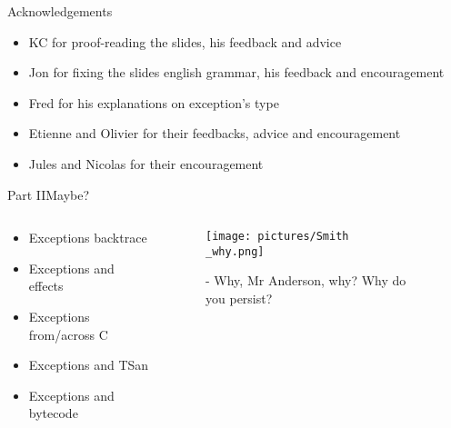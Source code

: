 \begin{frame}{Acknowledgements}
  \begin{itemize}
    \item KC for proof-reading the slides, his feedback and advice
    \item Jon for fixing the slides english grammar, his feedback and encouragement
    \item Fred for his explanations on exception's type
    \item Etienne and Olivier for their feedbacks, advice and encouragement
    \item Jules and Nicolas for their encouragement
  \end{itemize}
\end{frame}

\begin{frame}{Part II}{Maybe?}
  \begin{columns}[c]
    \begin{column}{0.3\textwidth}
      \begin{itemize}
        \item Exceptions backtrace
        \item Exceptions and effects
        \item Exceptions from/across C\footnotemark[1]
        \item Exceptions and TSan
        \item Exceptions and bytecode
      \end{itemize}
    \end{column}
    \begin{column}{0.7\textwidth}
      \begin{figure}
        \texttt{[image: pictures/Smith\\\_why.png]}
        \caption*{- Why, Mr Anderson, why? Why do you persist?}
      \end{figure}
    \end{column}
  \end{columns}
\end{frame}


